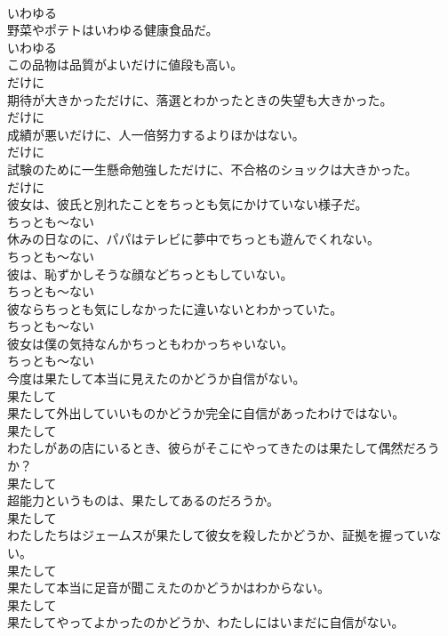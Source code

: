 \documentclass[8pt]{extreport}
\begin{document}
\begin{CJK}{UTF8}{min}
\\	いわゆる
\\	野菜やポテトはいわゆる健康食品だ。	
\\	いわゆる
\\	この品物は品質がよいだけに値段も高い。	
\\	だけに
\\	期待が大きかっただけに、落選とわかったときの失望も大きかった。	
\\	だけに
\\	成績が悪いだけに、人一倍努力するよりほかはない。	
\\	だけに
\\	試験のために一生懸命勉強しただけに、不合格のショックは大きかった。	
\\	だけに
\\	彼女は、彼氏と別れたことをちっとも気にかけていない様子だ。	
\\	ちっとも～ない
\\	休みの日なのに、パパはテレビに夢中でちっとも遊んでくれない。	
\\	ちっとも～ない
\\	彼は、恥ずかしそうな顔などちっともしていない。	
\\	ちっとも～ない
\\	彼ならちっとも気にしなかったに違いないとわかっていた。	
\\	ちっとも～ない
\\	彼女は僕の気持なんかちっともわかっちゃいない。	
\\	ちっとも～ない
\\	今度は果たして本当に見えたのかどうか自信がない。	
\\	果たして
\\	果たして外出していいものかどうか完全に自信があったわけではない。	
\\	果たして
\\	わたしがあの店にいるとき、彼らがそこにやってきたのは果たして偶然だろうか？	
\\	果たして
\\	超能力というものは、果たしてあるのだろうか。	
\\	果たして
\\	わたしたちはジェームスが果たして彼女を殺したかどうか、証拠を握っていない。	
\\	果たして
\\	果たして本当に足音が聞こえたのかどうかはわからない。	
\\	果たして
\\	果たしてやってよかったのかどうか、わたしにはいまだに自信がない。	

\end{CJK}
\end{document}
